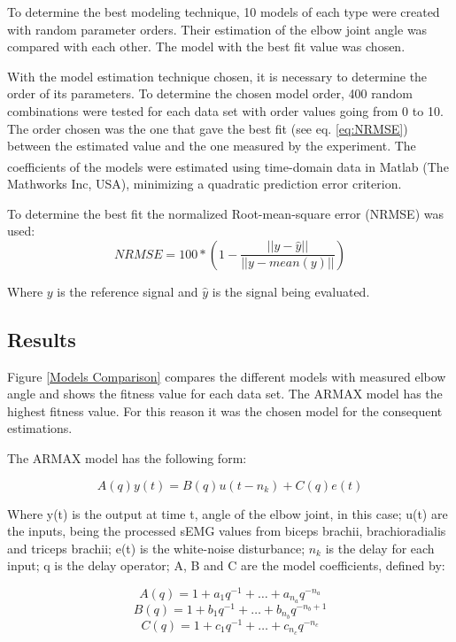 To determine the best modeling technique, 10 models of each type were created with random parameter orders. Their estimation of the elbow joint angle was compared with each other. The model with the best fit value was chosen.  

With the model estimation technique chosen, it is necessary to determine the order of its parameters. To determine the chosen model order, 400 random combinations were tested for each data set with order values going from 0 to 10. The order chosen was the one that gave the best fit (see eq. \ref{eq:NRMSE}) between the estimated value and the one measured by the experiment. The coefficients of the models were estimated using time-domain data in Matlab\textsuperscript{\textregistered} (The Mathworks Inc, USA), minimizing a quadratic prediction error criterion.

To determine the best fit the normalized Root-mean-square error (NRMSE)  was used:
\begin{equation}
\label{eq:NRMSE}
NRMSE = 100*\left(1- \frac{||y-\hat{y}||}{||y-mean(y)||}\right)
\end{equation}

Where $y$ is the reference signal and $\hat{y}$ is the signal being evaluated.

\subsection{Results}

Figure \ref{Models Comparison} compares the different models with measured elbow angle and shows the fitness value for each data set.
The ARMAX model has the highest fitness value. For this reason it was the chosen model for the consequent estimations.

The ARMAX model has the following form:

\begin{equation}
A(q)y(t) = B(q)u(t-n_k)+C(q)e(t)
\end{equation}


Where y(t) is the output at time t, angle of the elbow joint, in this case; u(t) are the inputs, being the processed sEMG values from biceps brachii, brachioradialis and triceps brachii; e(t) is the white-noise disturbance; \(n_k\)  is the delay for each input; q is the delay operator; A, B and C are the model coefficients, defined by:

\begin{equation}
A(q) = 1 + a_1q^{-1}+\dots+a_{n_a}q^{-n_a}
\end{equation}
\begin{equation}
B(q) = 1 + b_1q^{-1}+\dots+b_{n_b}q^{-n_b+1}
\end{equation}
\begin{equation}
C(q) = 1 + c_1q^{-1}+\dots+c_{n_c}q^{-n_c}
\end{equation}


